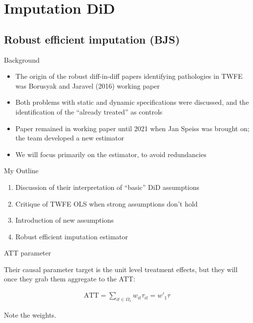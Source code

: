 \documentclass{beamer}
\begin{document}



\section{Imputation DiD}

\subsection{Robust efficient imputation (BJS)}



\begin{frame}{Background}

\begin{itemize}

\item The origin of the robust diff-in-diff papers identifying pathologies in TWFE was Borusyak and Jaravel (2016) working paper
\item Both problems with static and dynamic specifications were discussed, and the identification of the ``already treated'' as controls
\item Paper remained in working paper until 2021 when Jan Speiss was brought on; the team developed a new estimator
\item We will focus primarily on the estimator, to avoid redundancies

\end{itemize}

\end{frame}

\begin{frame}{My Outline}

\begin{enumerate}
\item Discussion of their interpretation of ``basic'' DiD assumptions
\item Critique of TWFE OLS when strong assumptions don't hold
\item Introduction of new assumptions
\item Robust efficient imputation estimator
\end{enumerate}

\end{frame}


\begin{frame}{ATT parameter}

Their causal parameter target is the unit level treatment effects, but they will once they grab them aggregate to the ATT:

\begin{eqnarray*}
\text{ATT} = \sum_{it \in \Omega_{1}}w_{it}\tau_{it} = w'_1\tau
\end{eqnarray*}

\bigskip

Note the weights. 


\end{frame}
\end{document}
